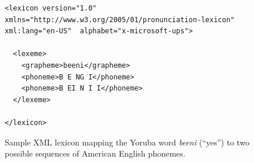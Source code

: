 \documentclass[11pt]{article}
\begin{document}

\begin{figure}
\begin{lstlisting}	
<lexicon version="1.0" xmlns="http://www.w3.org/2005/01/pronunciation-lexicon" xml:lang="en-US"  alphabet="x-microsoft-ups">
		 
  <lexeme>
    <grapheme>beeni</grapheme>
    <phoneme>B E NG I</phoneme>
    <phoneme>B EI N I I</phoneme>
  </lexeme>
  
</lexicon>
\end{lstlisting}
\caption{Sample XML lexicon mapping the Yoruba word \textit{beeni} (``yes'') to two possible sequences of American English phonemes.\label{fig:lexicon}}
\end{figure}

\end{document}

